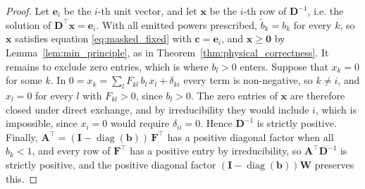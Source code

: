 \documentclass[preprint,1p,times]{elsarticle}
\theoremstyle{plain}
\theoremstyle{definition}
\theoremstyle{remark}
\begin{document}
\begin{proof}
Let $\mathbf{e}_i$ be the $i$-th unit vector, and let $\mathbf{x}$ be the $i$-th row of $\mathbf{D}^{-1}$, i.e. the solution of $\mathbf{D}^\top\mathbf{x} = \mathbf{e}_i$. With all emitted powers prescribed, $\tilde{b}_k = b_k$ for every $k$, so $\mathbf{x}$ satisfies equation \eqref{eq:masked_fixed} with $\mathbf{c} = \mathbf{e}_i$, and $\mathbf{x} \geq \mathbf{0}$ by Lemma~\ref{lem:min_principle}, as in Theorem~\ref{thm:physical_correctness}. It remains to exclude zero entries, which is where $b_l > 0$ enters. Suppose that $x_k = 0$ for some $k$. In $0 = x_k = \sum_l F_{kl}\, b_l\, x_l + \delta_{ki}$ every term is non-negative, so $k \neq i$, and $x_l = 0$ for every $l$ with $F_{kl} > 0$, since $b_l > 0$. The zero entries of $\mathbf{x}$ are therefore closed under direct exchange, and by irreducibility they would include $i$, which is impossible, since $x_i = 0$ would require $\delta_{ii} = 0$. Hence $\mathbf{D}^{-1}$ is strictly positive. Finally, $\mathbf{A}^\top = (\mathbf{I} - \operatorname{diag}(\mathbf{b}))\,\mathbf{F}^\top$ has a positive diagonal factor when all $b_k < 1$, and every row of $\mathbf{F}^\top$ has a positive entry by irreducibility, so $\mathbf{A}^\top\mathbf{D}^{-1}$ is strictly positive, and the positive diagonal factor $(\mathbf{I} - \operatorname{diag}(\mathbf{b}))\mathbf{W}$ preserves this.
\end{proof}
\end{document}
